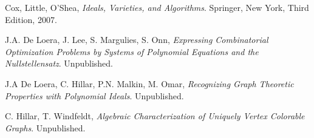 \documentclass{amsart}
\renewcommand{\(}{\left(}
\renewcommand{\)}{\right)}
\newcommand{\<}{\langle}
\renewcommand{\>}{\rangle}
\theoremstyle{definition}
\theoremstyle{remark}
\begin{document}

%



\begin{thebibliography}{9}

	Cox, Little, O'Shea,
	\emph{Ideals, Varieties, and Algorithms}.
	Springer, New York,
	Third Edition,
	2007.

	J.A. De Loera, J. Lee, S. Margulies, S. Onn,
	\emph{Expressing Combinatorial Optimization Problems by Systems of Polynomial Equations and the Nullstellensatz}.
	Unpublished.

	J.A De Loera, C. Hillar, P.N. Malkin, M. Omar,
	\emph{Recognizing Graph Theoretic Properties with Polynomial Ideals}.
	Unpublished.

	C. Hillar, T. Windfeldt,
	\emph{Algebraic Characterization of Uniquely Vertex Colorable Graphs}.
	Unpublished.

\end{thebibliography}
\end{document}
